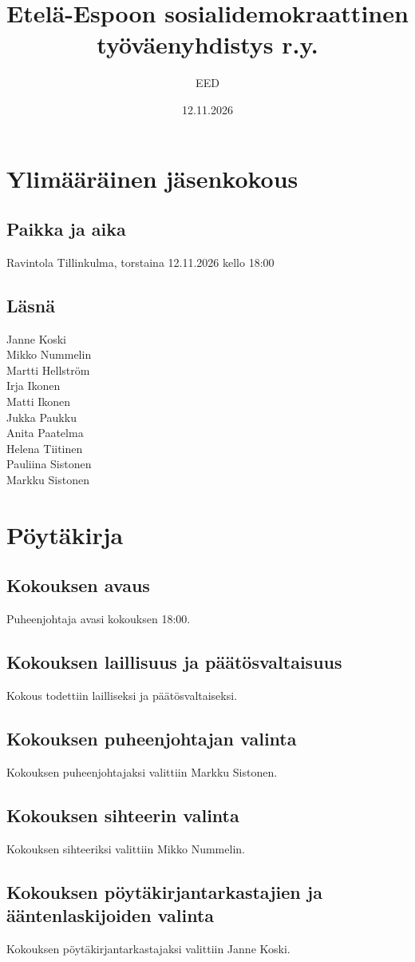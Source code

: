 \documentclass[a4paper,12pt]{article}
\title{Etelä-Espoon sosialidemokraattinen työväenyhdistys r.y.}
\author{EED}
\date{12.11.2026}
\begin{document}
\maketitle
\tableofcontents
\section*{Ylimääräinen jäsenkokous}
\subsection*{Paikka ja aika}
Ravintola Tillinkulma, torstaina 12.11.2026 kello 18:00
\subsection*{Läsnä}
Janne Koski \\
Mikko Nummelin \\
Martti Hellström \\
Irja Ikonen \\
Matti Ikonen \\
Jukka Paukku \\
Anita Paatelma \\
Helena Tiitinen \\
Pauliina Sistonen \\
Markku Sistonen
\section*{Pöytäkirja}
\subsection{Kokouksen avaus}
Puheenjohtaja avasi kokouksen 18:00.
\subsection{Kokouksen laillisuus ja päätösvaltaisuus}
Kokous todettiin lailliseksi ja päätösvaltaiseksi.
\subsection{Kokouksen puheenjohtajan valinta}
Kokouksen puheenjohtajaksi valittiin Markku Sistonen.
\subsection{Kokouksen sihteerin valinta}
Kokouksen sihteeriksi valittiin Mikko Nummelin.
\subsection{Kokouksen pöytäkirjantarkastajien ja ääntenlaskijoiden valinta}
Kokouksen pöytäkirjantarkastajaksi valittiin Janne Koski.
\end{document}
